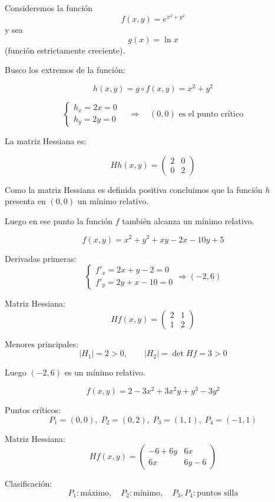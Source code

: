 \begin{Ejer}

Consideremos la función 
\[
f(x,y)=e^{x^2+y^2}
\]
y sea 
\[
g(x)=\ln x
\]
(función estrictamente creciente).

Busco los extremos de la función:

\[
h(x,y)=g\circ f(x,y)=x^2+y^2
\]

\[
\begin{cases}
h_x = 2x=0\\
h_y = 2y=0
\end{cases}
\quad \Longrightarrow \quad (0,0) \text{ es el punto crítico}
\]

La matriz Hessiana es:

\[
Hh(x,y)=
\begin{pmatrix}
2 & 0\\
0 & 2
\end{pmatrix}
\]

Como la matriz Hessiana es definida positiva concluimos que la función $h$ presenta en 
$(0,0)$ un mínimo relativo.

Luego en ese punto la función $f$ también alcanza un mínimo relativo.
\end{Ejer}


\begin{Ejer}

\[
f(x,y)=x^2+y^2+xy-2x-10y+5
\]

Derivadas primeras:
\[
\begin{cases}
f'_x=2x+y-2=0\\
f'_y=2y+x-10=0
\end{cases}
\Rightarrow (-2,6)
\]

Matriz Hessiana:
\[
Hf(x,y)=
\begin{pmatrix}
2 & 1\\
1 & 2
\end{pmatrix}
\]

Menores principales:
\[
|H_1|=2>0,\qquad |H_2|=\det Hf=3>0
\]

Luego $(-2,6)$ es un m\'inimo relativo.
\end{Ejer}

\begin{Ejer}
\[
f(x,y)=2-3x^2+3x^2y+y^3-3y^2
\]

Puntos cr\'iticos:
\[
P_1=(0,0),\; P_2=(0,2),\; P_3=(1,1),\; P_4=(-1,1)
\]

Matriz Hessiana:
\[
Hf(x,y)=
\begin{pmatrix}
-6+6y & 6x\\
6x & 6y-6
\end{pmatrix}
\]

Clasificaci\'on:
\[
P_1:\text{m\'aximo},\quad
P_2:\text{m\'inimo},\quad
P_3,P_4:\text{puntos silla}
\]
\end{Ejer}


